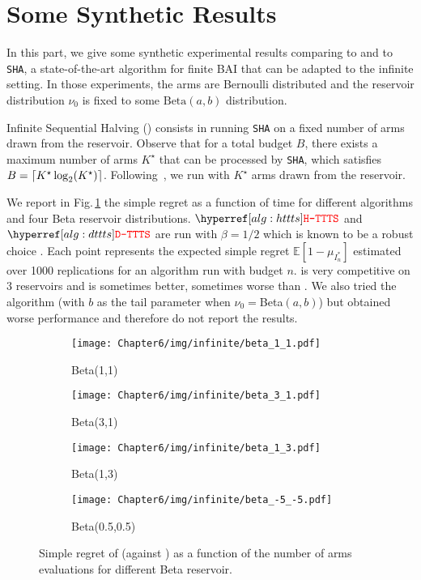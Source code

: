 \section{Some Synthetic Results}\label{app:dttts.experiments}
In this part, we give some synthetic experimental results comparing \DTTTS to \Hyperband and to \texttt{SHA}, a state-of-the-art algorithm for finite BAI that can be adapted to the infinite setting. In those experiments, the arms are Bernoulli distributed and the reservoir distribution $\nu_0$ is fixed to some $\text{Beta}(a,b)$ distribution. 

Infinite Sequential Halving (\ISHA) consists in running \texttt{SHA} on a fixed number of arms drawn from the reservoir. Observe that for a total budget $B$, there exists a maximum number of arms $K^\star$ that can be processed by \texttt{SHA}, which satisfies $B = \lceil K^\star\log_2(K^\star)\rceil$. Following~\cite{aziz2018infinite}, we run \ISHA with $K^\star$ arms drawn from the reservoir. %

We report in Fig.\,\ref{fig:dttts} the simple regret as a function of time for different algorithms and four Beta reservoir distributions. $\HTTTS$ and $\DTTTS$ are run with $\beta=1/2$ which is known to be a robust choice \citep{russo2016ttts}. Each point represents the expected simple regret $\mathbb{E}[1 - \mu_{I_n^*}]$ estimated over 1000 replications for an algorithm run with budget $n$. \DTTTS is very competitive on 3 reservoirs and \HTTTS is sometimes better, sometimes worse than \Hyperband. We also tried the \SiRI algorithm \citep{carpentier2015siri} (with $b$ as the tail parameter when $\nu_0=$Beta$(a,b)$) but obtained worse performance and therefore do not report the results.

\begin{figure}[ht]
  \centering
  \begin{subfigure}[t]{0.2\textwidth}
    \centering\texttt{[image: Chapter6/img/infinite/beta\_1\_1.pdf]}
    \caption{Beta(1,1)}
  \end{subfigure}%
\begin{subfigure}[t]{0.2\textwidth}
    \centering\texttt{[image: Chapter6/img/infinite/beta\_3\_1.pdf]}
    \caption{Beta(3,1)}
  \end{subfigure}
  \begin{subfigure}[t]{0.2\textwidth}
    \centering\texttt{[image: Chapter6/img/infinite/beta\_1\_3.pdf]}
    \caption{Beta(1,3)}
  \end{subfigure}%
  \begin{subfigure}[t]{0.2\textwidth}
    \centering\texttt{[image: Chapter6/img/infinite/beta\_-5\_-5.pdf]}
    \caption{Beta(0.5,0.5)}
  \end{subfigure}
  \caption{Simple regret of \DTTTS (against \Hyperband) as a function of the number of arms evaluations for different Beta reservoir.}
  \label{fig:dttts}
\end{figure}

